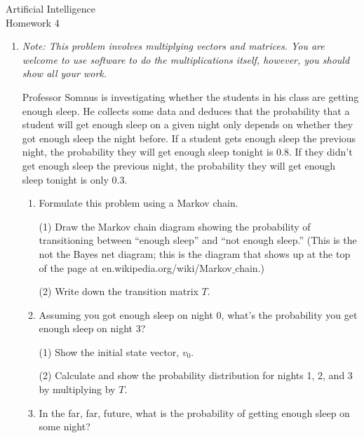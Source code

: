 \documentclass[letterpaper,11pt,english,oneside]{article}
\begin{document}
Artificial Intelligence \\
Homework 4


\begin{enumerate}


\item \emph{Note: This problem involves multiplying vectors and matrices.  You are welcome to use software to do the
multiplications itself, however, you should show all your work.  }



Professor Somnus is investigating whether the students in his class are getting enough 
sleep.  He collects some data and deduces that the probability that a student will get
enough sleep on a given night only depends on whether they got enough sleep the night before.
If a student gets enough sleep the previous night, the probability they will get enough sleep
tonight is 0.8.  If they didn't get enough sleep the previous night, the probability they
will get enough sleep tonight is only 0.3.  

\begin{enumerate}

	\item Formulate this problem using a Markov chain. 
	
	(1) Draw the Markov chain diagram 
	showing the probability of transitioning between ``enough sleep'' and ``not 
	enough sleep.'' (This is the not the Bayes net diagram; this is the diagram that shows up
	at the top of the page at en.wikipedia.org/wiki/Markov$\_$chain.)
	
	(2) Write down the transition matrix $T$.
	
	\item Assuming you got enough sleep on night 0, what's the probability you get enough
	sleep on night 3?
	
	(1) Show the initial state vector, $v_0$.
	
	(2) Calculate and show the probability distribution for nights 1, 2, and 3 by multiplying by $T$.
	
	\item In the far, far, future, what is the probability of getting enough sleep on 
	some night?

\end{enumerate}


\end{enumerate}
\end{document}
